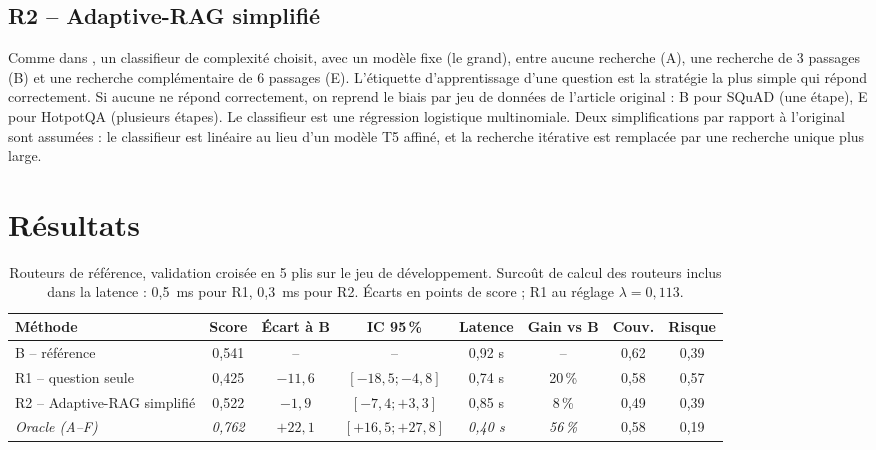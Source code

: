 \documentclass[11pt,a4paper]{article}
\begin{document}
\subsection{R2 -- Adaptive-RAG simplifié}
Comme dans \citet{jeong2024adaptiverag}, un classifieur de complexité choisit, avec un modèle fixe (le
grand), entre aucune recherche (A), une recherche de 3 passages (B) et une recherche complémentaire de
6 passages (E). L'étiquette d'apprentissage d'une question est la stratégie la plus simple qui répond
correctement. Si aucune ne répond correctement, on reprend le biais par jeu de données de l'article
original : B pour SQuAD (une étape), E pour HotpotQA (plusieurs étapes). Le classifieur est une
régression logistique multinomiale. Deux simplifications par rapport à l'original sont assumées :
le classifieur est linéaire au lieu d'un modèle T5 affiné, et la recherche itérative est remplacée
par une recherche unique plus large.

\section{Résultats}\label{sec:resultats}

\begin{table}[H]
\centering\footnotesize\setlength{\tabcolsep}{3.5pt}
\begin{tabular}{l c c c c c c c}
\toprule
\textbf{Méthode} & \textbf{Score} & \textbf{Écart à B} & \textbf{IC 95\,\%} & \textbf{Latence} & \textbf{Gain vs B} & \textbf{Couv.} & \textbf{Risque} \\
\midrule
B -- référence & 0,541 & -- & -- & 0,92 s & -- & 0,62 & 0,39 \\
R1 -- question seule & 0,425 & $-11{,}6$ & $[-18{,}5 ; -4{,}8]$ & 0,74 s & 20\,\% & 0,58 & 0,57 \\
R2 -- Adaptive-RAG simplifié & 0,522 & $-1{,}9$ & $[-7{,}4 ; +3{,}3]$ & 0,85 s & 8\,\% & 0,49 & 0,39 \\
\textit{Oracle (A--F)} & \textit{0,762} & $+22{,}1$ & $[+16{,}5 ; +27{,}8]$ & \textit{0,40 s} & \textit{56\,\%} & 0,58 & 0,19 \\
\bottomrule
\end{tabular}
\caption{Routeurs de référence, validation croisée en 5 plis sur le jeu de développement. Surcoût de
calcul des routeurs inclus dans la latence : 0,5~ms pour R1, 0,3~ms pour R2. Écarts en points de score ; R1 au réglage $\lambda = 0{,}113$.}
\label{tab:routeurs}
\end{table}
\end{document}
